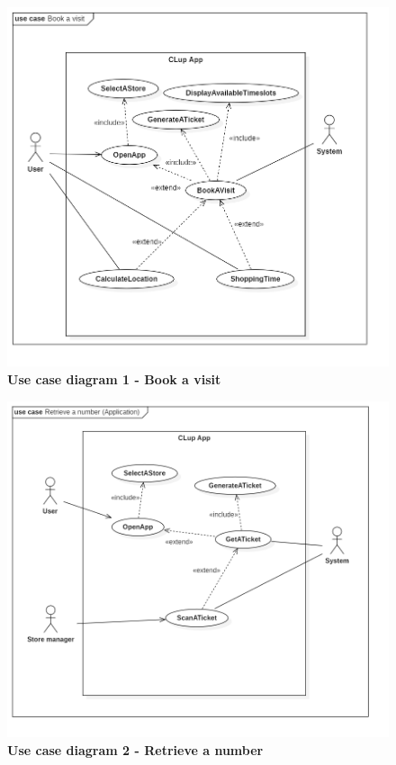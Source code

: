 \begin{figure}[!htb]
\centering
\includegraphics[width=\textwidth]{Images/UseCase1_BookAVisit}
\caption{\label{fig:usecase1}\textbf{Use case diagram 1 - Book a visit}}
\end{figure}

\begin{figure}[b]
\centering
\includegraphics[width=\textwidth]{Images/UseCase2_RetrieveANumber}
\caption{\label{fig:usecase2}\textbf{Use case diagram 2 - Retrieve a number}}
\end{figure}

